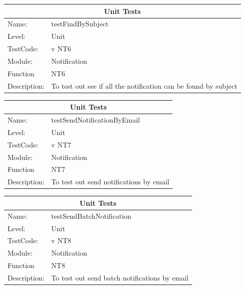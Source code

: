 \documentclass[12pt]{article}
\begin{document}
\begin{center}
\begin{tabular}{|l|p{12cm}|}
\hline
\multicolumn{2}{|c|}{\bf Unit Tests} \\
\hline
 Name: & testFindBySubject  \\
\hline
Level: & Unit \\
\hline
TestCode: & v NT6 \\
\hline
Module:& Notification\\
\hline
Function & NT6 \\
\hline
Description: & To test out see if all the notification can be found by subject \\
\hline

\end{tabular}
\end{center}

\begin{center}
\begin{tabular}{|l|p{12cm}|}
\hline
\multicolumn{2}{|c|}{\bf Unit Tests} \\
\hline
 Name: & testSendNotificationByEmail \\
\hline
Level: & Unit \\
\hline
TestCode: & v NT7 \\
\hline
Module:& Notification\\
\hline
Function & NT7 \\
\hline
Description: & To test out send notifications by email \\
\hline

\end{tabular}
\end{center}

\begin{center}
\begin{tabular}{|l|p{12cm}|}
\hline
\multicolumn{2}{|c|}{\bf Unit Tests} \\
\hline
 Name: & testSendBatchNotification \\
\hline
Level: & Unit \\
\hline
TestCode: & v NT8 \\
\hline
Module:& Notification\\
\hline
Function & NT8 \\
\hline
Description: & To test out send batch notifications by email \\
\hline

\end{tabular}
\end{center}
\end{document}
